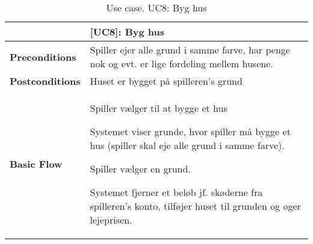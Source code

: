 \documentclass[class=article, crop=false]{standalone}
\begin{document}
    \begin{table}[H]
        \caption{Use case. UC8: Byg hus}
        \begin{tabularx}{\textwidth}{|l|X|}
            \hline
            & \textbf{[UC8]: Byg hus}   \\ \hline
            \textbf{Preconditions}       & Spiller ejer alle grund i samme farve, har penge nok og evt. er lige fordeling mellem husene.\\ \hline
            \textbf{Postconditions}      & Huset er bygget på spilleren's grund\\ \hline


            \textbf{Basic Flow} & \begin{tabenum}
                                      \item Spiller vælger til at bygge et hus
                                      \item Systemet viser grunde, hvor spiller må bygge et hus (spiller skal eje alle grund i samme farve).
                                      \item Spiller vælger en grund.
                                      \item Systemet fjerner et beløb jf. skøderne fra spilleren's konto, tilføjer huset til grunden
                                            og øger lejeprisen.
            \end{tabenum}   \\ \hline

        \end{tabularx}


    \end{table}
\end{document}
